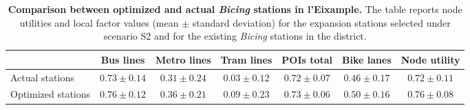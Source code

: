     \begin{table}[!htbp]
        \centering
        \footnotesize
        \caption[Comparison between optimized and actual \textit{Bicing} stations in l'Eixample]{
            \textbf{Comparison between optimized and actual \textit{Bicing} stations in l'Eixample.}
            The table reports node utilities and local factor values (mean $\pm$ standard deviation) for the expansion stations selected under scenario S2 and for the existing \textit{Bicing} stations in the district.
        }
        \label{tab:bicing_comparison}
        \begin{tabular}{lcccccc}
            \toprule
            & Bus lines & Metro lines & Tram lines & POIs total & Bike lanes & Node utility \\
            \midrule
            Actual stations & $0.73 \pm 0.14$ & $0.31 \pm 0.24$ & $0.03 \pm 0.12$ & $0.72 \pm 0.07$ & $0.46 \pm 0.17$ & $0.72 \pm 0.11$ \\
            Optimized stations & $0.76 \pm 0.12$ & $0.36 \pm 0.21$ & $0.09 \pm 0.23$ & $0.73 \pm 0.06$ & $0.50 \pm 0.16$ & $0.76 \pm 0.08$ \\
            \bottomrule
        \end{tabular}
    \end{table}